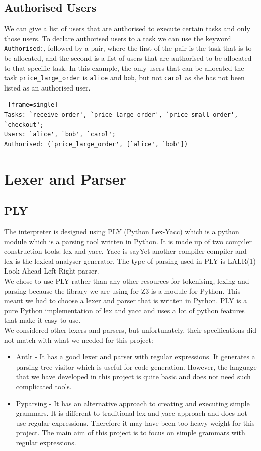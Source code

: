 \documentclass[a4paper]{report}
\begin{document}
\subsection{Authorised Users}
We can give a list of users that are authorised to execute certain tasks and only those users. To declare authorised users to a task we can use the keyword \texttt{Authorised:}, followed by a pair, where the first of the pair is the task that is to be allocated, and the second is a list of users that are authorised to be allocated to that specific task. In this example, the only users that can be allocated the task \texttt{price\_large\_order} is \texttt{alice} and \texttt{bob}, but not \texttt{carol} as she has not been listed as an authorised user.
\begin{lstlisting} [frame=single]
Tasks: `receive_order', `price_large_order', `price_small_order', 
`checkout'; 
Users: `alice', `bob', `carol';
Authorised: (`price_large_order', [`alice', `bob'])
\end{lstlisting}

\section{Lexer and Parser} 
\subsection{PLY}
The interpreter is designed using PLY\cite{ply} (Python Lex-Yacc) which is a python module which is a parsing tool written in Python. It is made up of two compiler construction tools: lex and yacc\cite{plylexyacc}. Yacc is say{Yet another compiler compiler} and lex is the lexical analyser generator. The type of parsing used in PLY is LALR(1)\cite{lalr} Look-Ahead Left-Right parser.\\

We chose to use PLY rather than any other resources for tokenising, lexing and parsing because the library we are using for Z3 is a module for Python. This meant we had to choose a lexer and parser that is written in Python. PLY is a pure Python implementation of lex and yacc and uses a lot of python features that make it easy to use. \\

We considered other lexers and parsers, but unfortunately, their specifications did not match with what we needed for this project:
\begin{itemize}
\item Antlr\cite{antlr} - It has a good lexer and parser with regular expressions. It generates a parsing tree visitor which is useful for code generation. However, the language that we have developed in this project is quite basic and does not need such complicated tools.
\item Pyparsing\cite{pyparsing} - It has an alternative approach to creating and executing simple grammars. It is different to traditional lex and yacc approach and does not use regular expressions. Therefore it may have been too heavy weight for this project. The main aim of this project is to focus on simple grammars with regular expressions.
\end{itemize}
\end{document}
